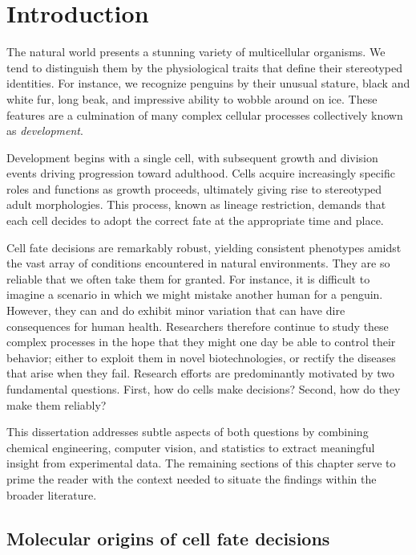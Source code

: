 \chapter{Introduction}

The natural world presents a stunning variety of multicellular organisms. We tend to distinguish them by the physiological traits that define their stereotyped identities. For instance, we recognize penguins by their unusual stature, black and white fur, long beak, and impressive ability to wobble around on ice. These features are a culmination of many complex cellular processes collectively known as \emph{development}.

Development begins with a single cell, with subsequent growth and division events driving progression toward adulthood. Cells acquire increasingly specific roles and functions as growth proceeds, ultimately giving rise to stereotyped adult morphologies. This process, known as lineage restriction, demands that each cell decides to adopt the correct fate at the appropriate time and place.

Cell fate decisions are remarkably robust, yielding consistent phenotypes amidst the vast array of conditions encountered in natural environments. They are so reliable that we often take them for granted. For instance, it is difficult to imagine a scenario in which we might mistake another human for a penguin. However, they can and do exhibit minor variation that can have dire consequences for human health. Researchers therefore continue to study these complex processes in the hope that they might one day be able to control their behavior; either to exploit them in novel biotechnologies, or rectify the diseases that arise when they fail. Research efforts are predominantly motivated by two fundamental questions. First, how do cells make decisions? Second, how do they make them reliably? 

This dissertation addresses subtle aspects of both questions by combining chemical engineering, computer vision, and statistics to extract meaningful insight from experimental data. The remaining sections of this chapter serve to prime the reader with the context needed to situate the findings within the broader literature. 

\section{Molecular origins of cell fate decisions}

